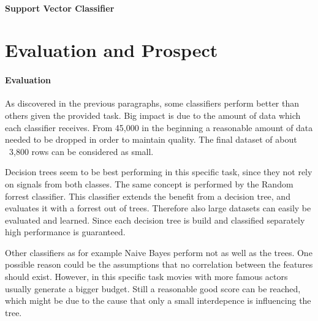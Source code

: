 \paragraph{Support Vector Classifier}
\section{Evaluation and Prospect}
\paragraph{Evaluation}
As discovered in the previous paragraphs, some classifiers perform better than others given the provided task. Big impact is due to the amount of data which each classifier receives. From 45,000 in the beginning a reasonable amount of data needed to be dropped in order to maintain quality. The final dataset of about ~3,800 rows can be considered as small. 

Decision trees seem to be best performing in this specific task, since they not rely on signals from both classes. The same concept is performed by the Random forrest classifier. This classifier extends the benefit from a decision tree, and evaluates it with a forrest out of trees. Therefore also large datasets can easily be evaluated and learned. Since each decision tree is build and classified separately high performance is guaranteed.

Other classifiers as for example Naive Bayes perform not as well as the trees. One possible reason could be the assumptions that no correlation between the features should exist. However, in this specific task movies with more famous actors usually generate a bigger budget. Still a reasonable good score can be reached, which might be due to the cause that only a small interdepence is influencing the tree.



